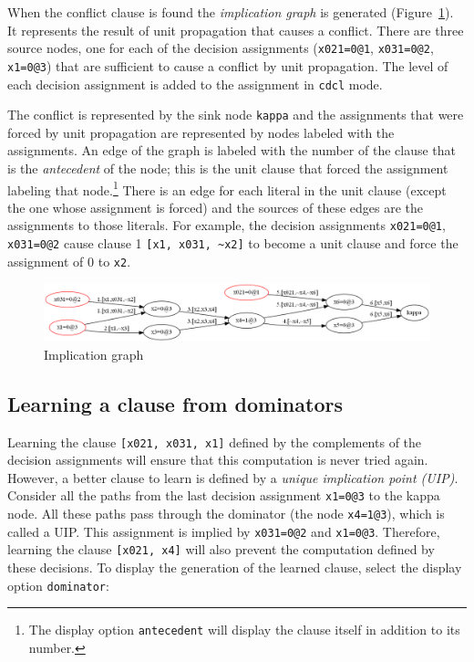 \documentclass[11pt]{report}
\newcommand*{\p}[1]{\textup{\texttt{#1}}}
\begin{document}
When the conflict clause is found the \emph{implication graph} is
generated (Figure~\ref{fig.graph}). It represents the result of unit
propagation that causes a conflict. There are three source nodes, one
for each of the decision assignments (\p{x021=0@1}, \p{x031=0@2},
\p{x1=0@3}) that are sufficient to cause a conflict by unit propagation.
The level of each decision assignment is added to the assignment in
\p{cdcl} mode.

The conflict is represented by the sink node \p{kappa} and the
assignments that were forced by unit propagation are represented by
nodes labeled with the assignments. An edge of the graph is labeled with
the number of the clause that is the \emph{antecedent} of the node; this
is the unit clause that forced the assignment labeling that
node.\footnote{The display option \p{antecedent} will display the clause
itself in addition to its number.} There is an edge for each literal in
the unit clause (except the one whose assignment is forced) and the
sources of these edges are the assignments to those literals. For
example, the decision assignments \p{x021=0@1}, \p{x031=0@2}
cause clause 1 \verb+[x1, x031, ~x2]+ to become a unit clause
and force the assignment of 0 to \p{x2}.

\begin{figure}
\begin{center}
\includegraphics[keepaspectratio=true,width=\textwidth]{graph}
\end{center}
\caption{Implication graph}\label{fig.graph}
\end{figure}

\subsection{Learning a clause from dominators}

Learning the clause \p{[x021, x031, x1]} defined by the complements of
the decision assignments will ensure that this computation is never
tried again. However, a better clause to learn is defined by a
\emph{unique implication point (UIP)}. Consider all the paths from the
last decision assignment \p{x1=0@3} to the kappa node. All these paths
pass through the dominator (the node \p{x4=1@3}), which is called a UIP.
This assignment is implied by \p{x031=0@2} and \p{x1=0@3}. Therefore,
learning the clause \p{[x021,~x4]} will also prevent the computation
defined by these decisions. To display the generation of the learned
clause, select the display option \p{dominator}:
\end{document}

